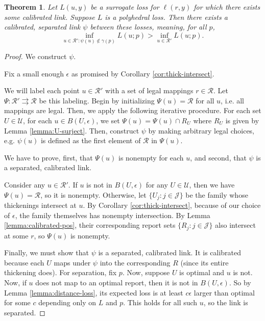 \documentclass{article}
\newcommand{\R}{\mathcal{R}}
\newcommand{\toto}{\rightrightarrows}
\newtheorem{theorem}{Theorem}
\begin{document}
\begin{theorem}
  Let $L(u,y)$ be a surrogate loss for $\ell(r,y)$ for which there exists some calibrated link.
  Suppose $L$ is a polyhedral loss.
  Then there exists a calibrated, \emph{separated} link $\psi$ between these losses, meaning, for all $p$,
    \[ \inf_{u \in \R' : \psi(u) \not\in \gamma(p)} L(u;p) > \inf_{u \in \R'} L(u;p) . \]
\end{theorem}
\begin{proof}
  We construct $\psi$.
  
  Fix a small enough $\epsilon$ as promised by Corollary \ref{cor:thick-intersect}.
  
  We will label each point $u \in \R'$ with a set of legal mappings $r \in \R$.
  Let $\Psi: \R' \toto \R$ be this labeling.
  Begin by initializing $\Psi(u) = \R$ for all $u$, i.e. all mappings are legal.
  Then, we apply the following iterative procedure.
  For each set $U \in \mathcal{U}$, for each $u \in B(U,\epsilon)$, we set $\Psi(u) = \Psi(u) \cap R_U$ where $R_U$ is given by Lemma \ref{lemma:U-surject}.
  Then, construct $\psi$ by making arbitrary legal choices, e.g. $\psi(u)$ is defined as the first element of $\R$ in $\Psi(u)$.
  
  We have to prove, first, that $\Psi(u)$ is nonempty for each $u$, and second, that $\psi$ is a separated, calibrated link.
  
  Consider any $u \in \R'$.
  If $u$ is not in $B(U,\epsilon)$ for any $U \in \mathcal{U}$, then we have $\Psi(u) = \R$, so it is nonempty.
  Otherwise, let $\{U_j : j \in \mathcal{J}\}$ be the family whose thickenings intersect at $u$.
  By Corollary \ref{cor:thick-intersect}, because of our choice of $\epsilon$, the family themselves has nonempty intersection.
  By Lemma \ref{lemma:calibrated-pos}, their corresponding report sets $\{R_j : j \in \mathcal{J}\}$ also intersect at some $r$, so $\Psi(u)$ is nonempty.
  
  Finally, we must show that $\psi$ is a separated, calibrated link.
  It is calibrated because each $U$ maps under $\psi$ into the corresponding $R$ (since its entire thickening does).
  For separation, fix $p$. Now, suppose $U$ is optimal and $u$ is not.
  Now, if $u$ does not map to an optimal report, then it is not in $B(U,\epsilon)$.
  So by Lemma \ref{lemma:distance-loss}, its expected loss is at least $c\epsilon$ larger than optimal for some $c$ depending only on $L$ and $p$.
  This holds for all such $u$, so the link is separated.
\end{proof}
\end{document}
